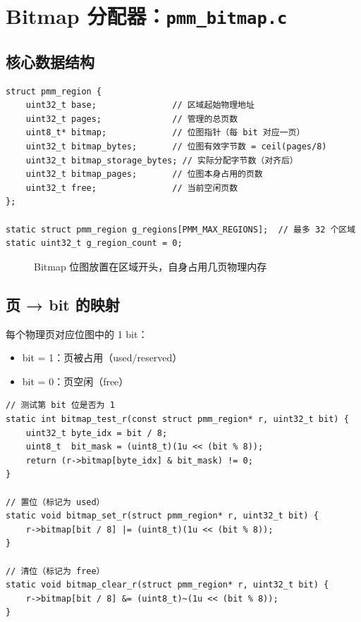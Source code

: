 \section{Bitmap 分配器：\texttt{pmm\_bitmap.c}}

\subsection{核心数据结构}

\begin{lstlisting}[style=cstyle]
struct pmm_region {
    uint32_t base;               // 区域起始物理地址
    uint32_t pages;              // 管理的总页数
    uint8_t* bitmap;             // 位图指针（每 bit 对应一页）
    uint32_t bitmap_bytes;       // 位图有效字节数 = ceil(pages/8)
    uint32_t bitmap_storage_bytes; // 实际分配字节数（对齐后）
    uint32_t bitmap_pages;       // 位图本身占用的页数
    uint32_t free;               // 当前空闲页数
};

static struct pmm_region g_regions[PMM_MAX_REGIONS];  // 最多 32 个区域
static uint32_t g_region_count = 0;
\end{lstlisting}

\begin{figure}[H]
  \centering
  
  \caption{Bitmap 位图放置在区域开头，自身占用几页物理内存}
\end{figure}

\subsection{页 → bit 的映射}

每个物理页对应位图中的 1 bit：
\begin{itemize}
  \item bit = 1：页被占用（used/reserved）
  \item bit = 0：页空闲（free）
\end{itemize}

\begin{lstlisting}[style=cstyle]
// 测试第 bit 位是否为 1
static int bitmap_test_r(const struct pmm_region* r, uint32_t bit) {
    uint32_t byte_idx = bit / 8;
    uint8_t  bit_mask = (uint8_t)(1u << (bit % 8));
    return (r->bitmap[byte_idx] & bit_mask) != 0;
}

// 置位（标记为 used）
static void bitmap_set_r(struct pmm_region* r, uint32_t bit) {
    r->bitmap[bit / 8] |= (uint8_t)(1u << (bit % 8));
}

// 清位（标记为 free）
static void bitmap_clear_r(struct pmm_region* r, uint32_t bit) {
    r->bitmap[bit / 8] &= (uint8_t)~(1u << (bit % 8));
}
\end{lstlisting}


